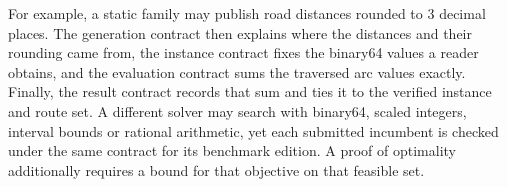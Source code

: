 For example, a static family may publish road distances rounded to 3 decimal places. The generation contract then explains where the distances and their rounding came from, the instance contract fixes the binary64 values a reader obtains, and the evaluation contract sums the traversed arc values exactly. Finally, the result contract records that sum and ties it to the verified instance and route set. A different solver may search with binary64, scaled integers, interval bounds or rational arithmetic, yet each submitted incumbent is checked under the same contract for its benchmark edition. A proof of optimality additionally requires a bound for that objective on that feasible set.
